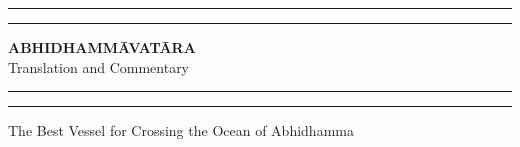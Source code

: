 %
\frontmatter
\begin{titlepage} %

	\centering %
	
	\scshape %
	
	\vspace*{\baselineskip} %
	
	
	\rule{\textwidth}{1.6pt}\vspace*{-\baselineskip}\vspace*{2pt} %
	\rule{\textwidth}{0.4pt} %
	
	\vspace{0.75\baselineskip} %
	
	{\LARGE \textbf{ABHIDHAMMĀVATĀRA}\\ \Large{Translation and Commentary}} %
	
	\vspace{0.75\baselineskip} %
	
	\rule{\textwidth}{0.4pt}\vspace*{-\baselineskip}\vspace{3.2pt} %
	\rule{\textwidth}{1.6pt} %
	
	\vspace{2\baselineskip} %
	
	
	The Best Vessel for Crossing the Ocean of Abhidhamma %
	
	\vspace*{3\baselineskip} %
	
	
	
	\vspace{0.5\baselineskip} %
	

\end{titlepage}
